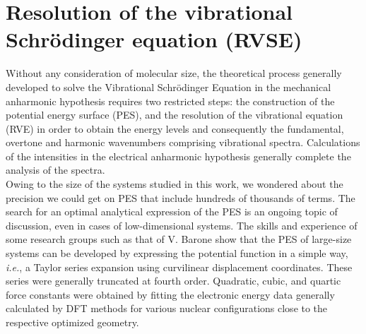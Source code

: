 	\section{Resolution of the vibrational Schr\"{o}dinger equation  (RVSE)}
	
	Without any consideration of molecular size, the theoretical process generally developed to solve the Vibrational Schrödinger Equation in the mechanical anharmonic hypothesis requires two restricted steps: the construction of the potential energy surface (PES), and the resolution of the vibrational equation (RVE) in order to obtain the energy levels and consequently the fundamental, overtone and harmonic wavenumbers comprising vibrational spectra. Calculations of the intensities in the electrical anharmonic hypothesis generally complete the analysis of the spectra.\\ 
	
	Owing to the size of the systems studied in this work, we wondered about the precision we could get on PES that include hundreds of thousands of terms. The search for an optimal analytical expression of the PES is an ongoing topic of discussion, even in cases of low-dimensional systems. The skills and experience of some research groups such as that of V. Barone\cite{barone2014fully} show that the PES of large-size systems can be developed by expressing the potential function in a simple way, \textit{i.e.}, a Taylor series expansion using curvilinear displacement coordinates. These series were generally truncated at fourth order. Quadratic, cubic, and quartic force constants were obtained by fitting the electronic energy data generally calculated by DFT methods for various nuclear configurations close to the respective optimized geometry.\\  
	
